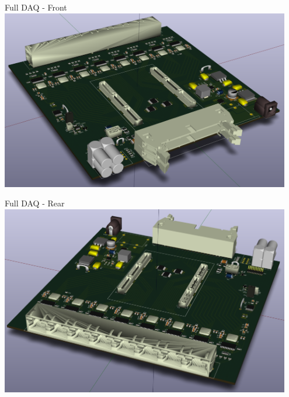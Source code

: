 \documentclass{beamer}
\begin{document}
\begin{frame}{Full DAQ - Front}
  \centering
  \includegraphics[width=0.95\textwidth]{figures/DAQCard2015_Full_Front_small}
\end{frame}

\begin{frame}{Full DAQ - Rear}
  \centering
  \includegraphics[width=0.95\textwidth]{figures/DAQCard2015_Full_Back_small}
\end{frame}
\end{document}
